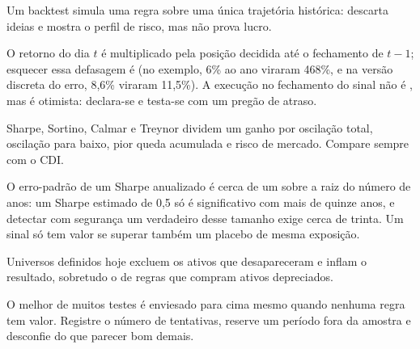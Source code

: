 \begin{resumo}
  \item Um backtest simula uma regra sobre uma única trajetória histórica: descarta ideias e mostra o perfil de risco, mas não prova lucro.
  \item O retorno do dia $t$ é multiplicado pela posição decidida até o fechamento de $t-1$; esquecer essa defasagem é  (no exemplo, 6\% ao ano viraram 468\%, e na versão discreta do erro, 8,6\% viraram 11,5\%). A execução no fechamento do sinal não é , mas é otimista: declara-se e testa-se com um pregão de atraso.
  \item Sharpe, Sortino, Calmar e Treynor dividem um ganho por oscilação total, oscilação para baixo, pior queda acumulada e risco de mercado. Compare sempre com o CDI.
  \item O erro-padrão de um Sharpe anualizado é cerca de um sobre a raiz do número de anos: um Sharpe estimado de 0,5 só é significativo com mais de quinze anos, e detectar com segurança um verdadeiro desse tamanho exige cerca de trinta. Um sinal só tem valor se superar também um placebo de mesma exposição.
  \item Universos definidos hoje excluem os ativos que desapareceram e inflam o resultado, sobretudo o de regras que compram ativos depreciados.
  \item O melhor de muitos testes é enviesado para cima mesmo quando nenhuma regra tem valor. Registre o número de tentativas, reserve um período fora da amostra e desconfie do que parecer bom demais.
\end{resumo}

